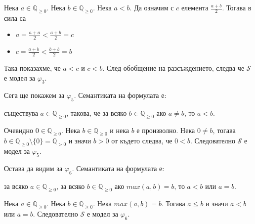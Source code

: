 \documentclass[17pt]{extarticle}
\begin{document}
Нека \(a \in \mathbb{Q}_{\geq 0}\). Нека \(b \in \mathbb{Q}_{\geq 0}\). Нека \(a < b\). Да означим с \(c\) елемента \(\displaystyle\frac{a + b}{2}\).
Тогава в сила са

\begin{itemize}
    \item \(a = \displaystyle\frac{a + a}{2} < \displaystyle\frac{a + b}{2} = c\)
    \item \(c = \displaystyle\frac{a + b}{2} < \displaystyle\frac{b + b}{2} = b\)
\end{itemize}

Така показахме, че  \(a < c\) и \(c < b\).
След обобщение на разсъждението, следва че \(\mathcal S\) е модел за \(\varphi_3\).

\vspace{5mm}

\par Сега ще покажем за \(\varphi_5\). Семантиката на формулата е:

\begin{displayquote}
съществува \(a \in \mathbb{Q}_{\geq 0}\), такова, че за всяко \(b \in \mathbb{Q}_{\geq 0}\) ако \(a \neq b\), то \(a < b\).
\end{displayquote}

Очевидно \(0 \in \mathbb{Q}_{\geq 0}\). Нека \(b \in \mathbb{Q}_{\geq 0}\) и нека \(b\) е произволно.
Нека \(0 \neq b\), тогава \(b \in \mathbb{Q}_{\geq 0} \setminus \{0\} = \mathbb{Q}_{> 0}\) и значи \(b > 0\) от където следва, че \(0 < b\).
Следователно \(\mathcal S\) е модел за \(\varphi_5\).

\vspace{5mm}

\par Остава да видим за \(\varphi_6\). Семантиката на формулата е:

\begin{displayquote}
за всяко \(a \in \mathbb{Q}_{\geq 0}\), за всяко \(b \in \mathbb{Q}_{\geq 0}\) ако \(max(a, b) = b\), то \(a < b\) или \(a = b\).
\end{displayquote}

Нека \(a \in \mathbb{Q}_{\geq 0}\). Нека \(b \in \mathbb{Q}_{\geq 0}\). Нека \(max(a, b) = b\). Тогава \(a \leq b\) и значи \(a < b\) или \(a = b\).
Следователно \(\mathcal S\) е модел за \(\varphi_6\).

\vspace{5mm}
\end{document}
